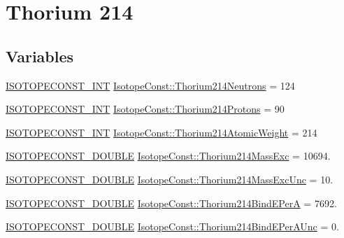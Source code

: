 \hypertarget{group___isotope_const-_thorium-_th214}{}\section{Thorium 214}
\label{group___isotope_const-_thorium-_th214}
\subsection*{Variables}
\begin{DoxyCompactItemize}
\item 
\mbox{\hyperlink{group___isotope_const-_macros_ga5f18360b3e99483a35c32d789e62621c}{I\+S\+O\+T\+O\+P\+E\+C\+O\+N\+S\+T\+\_\+\+I\+NT}} \mbox{\hyperlink{group___isotope_const-_thorium-_th214_gad43fbb556c440e61bd8eada6db30f6b2}{Isotope\+Const\+::\+Thorium214\+Neutrons}} = 124
\item 
\mbox{\hyperlink{group___isotope_const-_macros_ga5f18360b3e99483a35c32d789e62621c}{I\+S\+O\+T\+O\+P\+E\+C\+O\+N\+S\+T\+\_\+\+I\+NT}} \mbox{\hyperlink{group___isotope_const-_thorium-_th214_gaf106865dc617bf904ee9de268b71bdd8}{Isotope\+Const\+::\+Thorium214\+Protons}} = 90
\item 
\mbox{\hyperlink{group___isotope_const-_macros_ga5f18360b3e99483a35c32d789e62621c}{I\+S\+O\+T\+O\+P\+E\+C\+O\+N\+S\+T\+\_\+\+I\+NT}} \mbox{\hyperlink{group___isotope_const-_thorium-_th214_ga1d22ce84d969ea04ee062cc47320cc02}{Isotope\+Const\+::\+Thorium214\+Atomic\+Weight}} = 214
\item 
\mbox{\hyperlink{group___isotope_const-_macros_ga8f45a7272ce02c0b4c65c44636ed719a}{I\+S\+O\+T\+O\+P\+E\+C\+O\+N\+S\+T\+\_\+\+D\+O\+U\+B\+LE}} \mbox{\hyperlink{group___isotope_const-_thorium-_th214_ga23090120f5c4ca4efc0c1ef6fd5ba020}{Isotope\+Const\+::\+Thorium214\+Mass\+Exc}} = 10694.
\item 
\mbox{\hyperlink{group___isotope_const-_macros_ga8f45a7272ce02c0b4c65c44636ed719a}{I\+S\+O\+T\+O\+P\+E\+C\+O\+N\+S\+T\+\_\+\+D\+O\+U\+B\+LE}} \mbox{\hyperlink{group___isotope_const-_thorium-_th214_ga5adc131a24df56d076c0ca56a68d813e}{Isotope\+Const\+::\+Thorium214\+Mass\+Exc\+Unc}} = 10.
\item 
\mbox{\hyperlink{group___isotope_const-_macros_ga8f45a7272ce02c0b4c65c44636ed719a}{I\+S\+O\+T\+O\+P\+E\+C\+O\+N\+S\+T\+\_\+\+D\+O\+U\+B\+LE}} \mbox{\hyperlink{group___isotope_const-_thorium-_th214_ga7e851cc455a6498d052f1ece92f7eec2}{Isotope\+Const\+::\+Thorium214\+Bind\+E\+PerA}} = 7692.
\item 
\mbox{\hyperlink{group___isotope_const-_macros_ga8f45a7272ce02c0b4c65c44636ed719a}{I\+S\+O\+T\+O\+P\+E\+C\+O\+N\+S\+T\+\_\+\+D\+O\+U\+B\+LE}} \mbox{\hyperlink{group___isotope_const-_thorium-_th214_ga98147b7ebbd73840b43ad1e661119306}{Isotope\+Const\+::\+Thorium214\+Bind\+E\+Per\+A\+Unc}} = 0.

\end{DoxyCompactItemize}

